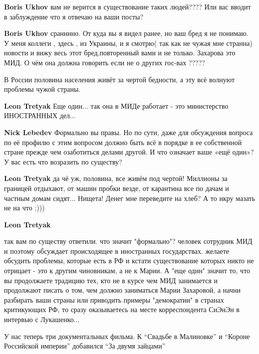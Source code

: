 \begin{itemize}
\begin{itemize}
\textbf{Boris Ukhov} вам не верится в существование таких людей???? Или вас вводит в заблуждение что я отвечаю на ваши посты?

\textbf{Boris Ukhov} сранннно. От куда вы я видел ранее, но ваш бред я не понимаю. У меня коллеги , здесь , из Украины, и я смотрю( так как не чужая мне странна) новости и вижу весь этот бред,повторенный вами и не только. Захарова это МИД. О чём она должна говорить если не о других гос-вах ?????

\end{itemize} %


В России половина населения живёт за чертой бедности, а эту всё волнуют
проблемы чужой страны.

\begin{itemize} %
\textbf{Leon Tretyak} Еще один... так она в МИДе работает - это министерство ИНОСТРАННЫХ дел...

\textbf{Nick Lebedev} Формально вы правы. Но по сути, даже для обсуждения вопроса по её профилю с этим вопросом должно быть всё в порядке в ее собственной стране прежде чем озаботиться делами другой. И что означает ваше «ещё один»? У вас есть что возразить по существу?

\textbf{Leon Tretyak} да чё уж, половина, все живём под чертой! Миллионы за границей отдыхают, от машин пробки везде, от карантина все по дачам и частным домам сидят... Нищета! Денег мне переведите на хлеб? А то икру мазать не на что ;)))

\textbf{Leon Tretyak} 

так вам по существу ответили. что значит "формально"? человек сотрудник МИД и
поэтому обсуждает происходящее в иностранных государствах. желаете обсудить
проблемы, которые есть в РФ и кстати существование которых никто не отрицает -
это к другим чиновникам, а не к Марии. А "еще один" значит то, что вы
продолжаете традицию тех, кто не в курсе чем МИД занимается и продолжают писать
о том, чем должно заниматься Марии Захаровой, а начни разбирать ваши страны или
приводить примеры "демократии" в странах критикующих РФ, то сразу оказываетесь
на месте корреспондента СиЭнЭн в интервью с Лукашенко...

\end{itemize} %


У нас теперь три документальных фильма. К \enquote{Свадьбе в Малиновке} и \enquote{Короне
Российской империи} добавился \enquote{За двумя зайцами}


\end{itemize}
